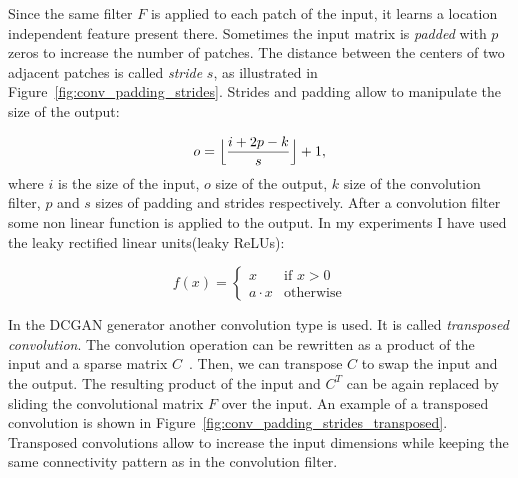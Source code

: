 Since the same filter $F$ is applied to each patch of the input, it learns a location independent feature present there. Sometimes the input matrix is \textit{padded} with $p$ zeros to increase the number of patches. The distance between the centers of two adjacent patches is called \textit{stride} $s$, as illustrated in Figure~\ref{fig:conv_padding_strides}. Strides and padding allow to manipulate the size of the output:

\begin{equation}
	o = \Bigl\lfloor \frac{i + 2p - k}{s} \Bigr\rfloor + 1,
\end{equation}
where $i$ is the size of the input, $o$ size of the output, $k$ size of the convolution filter, $p$ and $s$ sizes of padding and strides respectively. After a convolution filter some non linear function is applied to the output. In my experiments I have used the leaky rectified linear units(leaky ReLUs): 

\begin{equation}
	f(x) = \begin{cases}
			x & \text{if }x > 0\\
			a \cdot x &\text{otherwise}
			\end{cases}	
\end{equation}

In the DCGAN generator another convolution type is used. It is called \textit{transposed convolution}. The convolution operation can be rewritten as a product of the input and a sparse matrix $C$~\cite{conv_tutorial}. Then, we can transpose $C$ to swap the input and the output. The resulting product of the input and $C^T$ can be again replaced by sliding the convolutional matrix $F$ over the input. An example of a transposed convolution is shown in Figure~\ref{fig:conv_padding_strides_transposed}. Transposed convolutions allow to increase the input dimensions while keeping the same connectivity pattern as in the convolution filter. 

